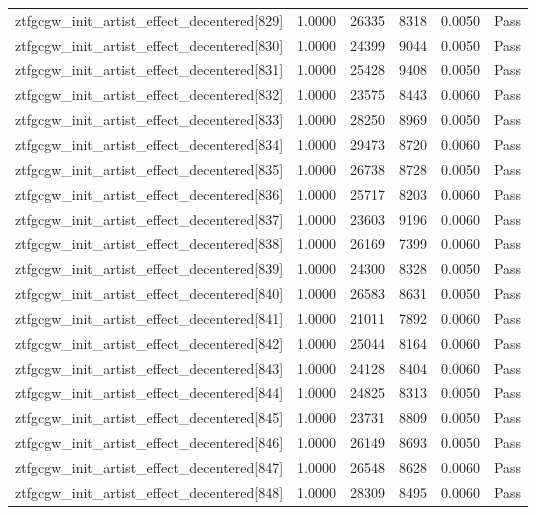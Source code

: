 \begin{table}[htbp]
\begin{tabular}{llrrll}
ztfgcgw\_init\_artist\_effect\_decentered[829] & 1.0000 & 26335 & 8318 & 0.0050 & Pass \\
ztfgcgw\_init\_artist\_effect\_decentered[830] & 1.0000 & 24399 & 9044 & 0.0050 & Pass \\
ztfgcgw\_init\_artist\_effect\_decentered[831] & 1.0000 & 25428 & 9408 & 0.0050 & Pass \\
ztfgcgw\_init\_artist\_effect\_decentered[832] & 1.0000 & 23575 & 8443 & 0.0060 & Pass \\
ztfgcgw\_init\_artist\_effect\_decentered[833] & 1.0000 & 28250 & 8969 & 0.0050 & Pass \\
ztfgcgw\_init\_artist\_effect\_decentered[834] & 1.0000 & 29473 & 8720 & 0.0060 & Pass \\
ztfgcgw\_init\_artist\_effect\_decentered[835] & 1.0000 & 26738 & 8728 & 0.0050 & Pass \\
ztfgcgw\_init\_artist\_effect\_decentered[836] & 1.0000 & 25717 & 8203 & 0.0060 & Pass \\
ztfgcgw\_init\_artist\_effect\_decentered[837] & 1.0000 & 23603 & 9196 & 0.0060 & Pass \\
ztfgcgw\_init\_artist\_effect\_decentered[838] & 1.0000 & 26169 & 7399 & 0.0060 & Pass \\
ztfgcgw\_init\_artist\_effect\_decentered[839] & 1.0000 & 24300 & 8328 & 0.0050 & Pass \\
ztfgcgw\_init\_artist\_effect\_decentered[840] & 1.0000 & 26583 & 8631 & 0.0050 & Pass \\
ztfgcgw\_init\_artist\_effect\_decentered[841] & 1.0000 & 21011 & 7892 & 0.0060 & Pass \\
ztfgcgw\_init\_artist\_effect\_decentered[842] & 1.0000 & 25044 & 8164 & 0.0060 & Pass \\
ztfgcgw\_init\_artist\_effect\_decentered[843] & 1.0000 & 24128 & 8404 & 0.0060 & Pass \\
ztfgcgw\_init\_artist\_effect\_decentered[844] & 1.0000 & 24825 & 8313 & 0.0050 & Pass \\
ztfgcgw\_init\_artist\_effect\_decentered[845] & 1.0000 & 23731 & 8809 & 0.0050 & Pass \\
ztfgcgw\_init\_artist\_effect\_decentered[846] & 1.0000 & 26149 & 8693 & 0.0050 & Pass \\
ztfgcgw\_init\_artist\_effect\_decentered[847] & 1.0000 & 26548 & 8628 & 0.0060 & Pass \\
ztfgcgw\_init\_artist\_effect\_decentered[848] & 1.0000 & 28309 & 8495 & 0.0060 & Pass \\

\end{tabular}
\end{table}
